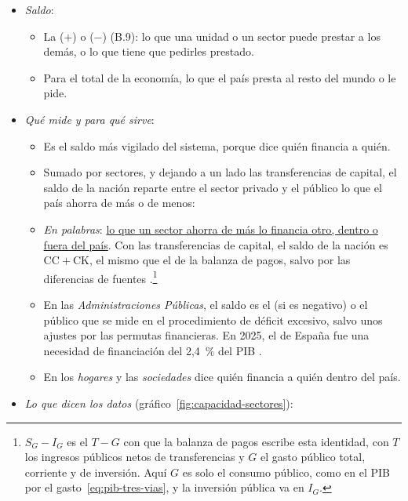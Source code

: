 \documentclass[11pt]{article}
\begin{document}
\begin{itemize}
\item \emph{Saldo}:
  \begin{itemize}
  \item La  ($+$) o  ($-$)  (B.9): lo que una unidad o un sector puede prestar a los demás, o lo que tiene que pedirles prestado.
  \item Para el total de la economía, lo que el país presta al resto del mundo o le pide.
  \end{itemize}
\item \emph{Qué mide y para qué sirve}:
  \begin{itemize}
  \item Es el saldo más vigilado del sistema, porque dice quién financia a quién.
  \item Sumado por sectores, y dejando a un lado las transferencias de capital, el saldo de la nación reparte entre el sector privado y el público lo que el país ahorra de más o de menos:
  \item \emph{En palabras}: \uline{lo que un sector ahorra de más lo financia otro, dentro o fuera del país}. Con las transferencias de capital, el saldo de la nación es $\mathrm{CC}+\mathrm{CK}$, el mismo que el de la balanza de pagos, salvo por las diferencias de fuentes .\footnote{$S_G-I_G$ es el $T-G$ con que la balanza de pagos escribe esta identidad, con $T$ los ingresos públicos netos de transferencias y $G$ el gasto público total, corriente y de inversión. Aquí $G$ es solo el consumo público, como en el PIB por el gasto~\eqref{eq:pib-tres-vias}, y la inversión pública va en $I_G$.}
  \item En las \emph{Administraciones Públicas}, el saldo es el  (si es negativo) o el  público que se mide en el procedimiento de déficit excesivo, salvo unos ajustes por las permutas financieras. En 2025, el de España fue una necesidad de financiación del 2,4~\% del PIB\nocite{Eurostat2026nasa10nftr}   .
  \item En los \emph{hogares} y las \emph{sociedades} dice quién financia a quién dentro del país.
  \end{itemize}
\item \emph{Lo que dicen los datos} (gráfico~\ref{fig:capacidad-sectores}):

\end{itemize}
\end{document}
